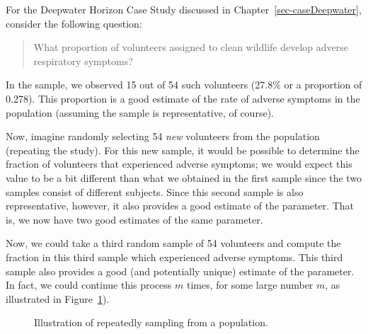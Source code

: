 \documentclass[
  letterpaper,
  DIV=11,
  numbers=noendperiod]{scrreprt}
\theoremstyle{definition}
\theoremstyle{definition}
\theoremstyle{plain}
\theoremstyle{remark}
\begin{document}
For the Deepwater Horizon Case Study discussed in
Chapter~\ref{sec-caseDeepwater}, consider the following question:

\begin{quote}
What proportion of volunteers assigned to clean wildlife develop adverse
respiratory symptoms?
\end{quote}

In the sample, we observed 15 out of 54 such volunteers (27.8\% or a
proportion of 0.278). This proportion is a good estimate of the rate of
adverse symptoms in the population (assuming the sample is
representative, of course).

Now, imagine randomly selecting 54 \emph{new} volunteers from the
population (repeating the study). For this new sample, it would be
possible to determine the fraction of volunteers that experienced
adverse symptoms; we would expect this value to be a bit different than
what we obtained in the first sample since the two samples consist of
different subjects. Since this second sample is also representative,
however, it also provides a good estimate of the parameter. That is, we
now have two good estimates of the same parameter.

Now, we could take a third random sample of 54 volunteers and compute
the fraction in this third sample which experienced adverse symptoms.
This third sample also provides a good (and potentially unique) estimate
of the parameter. In fact, we could continue this process \(m\) times,
for some large number \(m\), as illustrated in
Figure~\ref{fig-samplingdistns-sampling-distribution}).

\begin{figure}


\caption{\label{fig-samplingdistns-sampling-distribution}Illustration of
repeatedly sampling from a population.}

\end{figure}%
\end{document}
